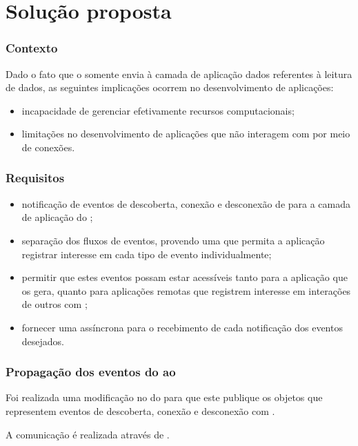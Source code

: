 \documentclass[aspectratio=169]{beamer}
\begin{document}
\section{Solução proposta}


\begin{frame}
	\frametitle{Contexto}
	Dado o fato que o \cddl somente envia à camada de aplicação dados referentes à leitura de dados, as seguintes implicações ocorrem no desenvolvimento de aplicações:

	\bigskip
	\begin{itemize}
		\item incapacidade de gerenciar efetivamente recursos computacionais;

			\bigskip

		\item limitações no desenvolvimento de aplicações que não interagem com \smartobjs por meio de conexões.
	\end{itemize}
\end{frame}

\begin{frame}
	\frametitle{Requisitos}
	\begin{itemize}
		\item notificação de eventos de descoberta, conexão e desconexão de \smartobjs para a camada de aplicação do \software;

		\item separação dos fluxos de eventos, provendo uma \api que permita a aplicação registrar interesse em cada tipo de evento individualmente;

		\item permitir que estes eventos possam estar acessíveis tanto para a aplicação que os gera, quanto para aplicações remotas que registrem interesse em interações de outros \smartphones com \smartobjs;

		\item fornecer uma \api assíncrona para o recebimento de cada notificação dos eventos desejados.
	\end{itemize}
\end{frame}

\begin{frame}
	\frametitle{Propagação dos eventos do \stwopa ao \cddl}
	Foi realizada uma modificação no \stwopa do \mhub para que este publique os objetos \sensordata que representem eventos de descoberta, conexão e desconexão com \smartobjs.

	\bigskip

	A comunicação é realizada através de \eventbus.
\end{frame}
\end{document}
